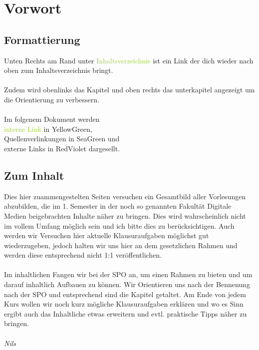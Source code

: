 \section{Vorwort}
    \subsection{Formattierung}
Unten Rechts am Rand unter \textcolor{YellowGreen}{Inhaltsverzeichnis} ist ein Link der dich wieder nach oben zum Inhaltsverzeichnis bringt.\\~\\
Zudem wird obenlinks das Kapitel und oben rechts das unterkapitel angezeigt um die Orientierung zu verbessern.\\~\\
Im folgenem Dokument werden \\
\textcolor{YellowGreen}{interne Link} in YellowGreen,   \\   
\textcolor{Cerulean}{Quellenverlinkungen} in SeaGreen und \\         
\textcolor{RedViolet}{externe Links} in  RedViolet dargesellt.
    \subsection{Zum Inhalt}
Dies hier zuammengestelten Seiten versuchen ein Gesamtbild aller Vorlesungen abzubilden, die im 1. Semester in der noch so genannten Fakultät Digitale Medien beigebrachten Inhalte näher zu bringen. Dies wird wahrscheinlich nicht im vollem Umfang möglich sein und ich bitte dies zu berücksichtigen. Auch werden wir Versuchen hier aktuelle Klausuraufgaben möglichst gut wiederzugeben, jedoch halten wir uns hier an dem gesetzlichen Rahmen und werden diese entsprechend nicht 1:1 veröffentlichen.\\~\\
Im inhaltlichen Fangen wir bei der SPO an, um einen Rahmen zu bieten und um darauf inhaltlich Aufbauen zu können. Wir Orientieren uns nach der Bennenung nach der SPO und entsprechend sind die Kapitel getaltet. Am Ende von jedem Kurs wollen wir noch kurz mögliche Klausuraufgaben erklären und wo es Sinn ergibt auch das Inhaltliche etwas erweitern und evtl. praktische Tipps näher zu bringen.\\~\\
\emph{Nils}